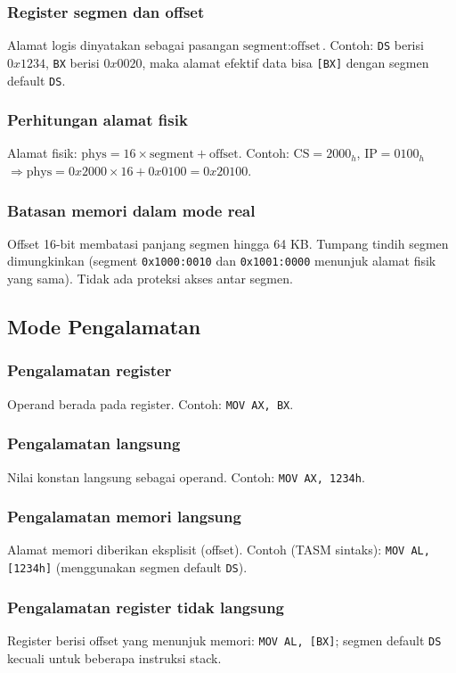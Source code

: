 \subsubsection{Register segmen dan offset}
Alamat logis dinyatakan sebagai pasangan \(\text{segment}:\text{offset}\). Contoh: \texttt{DS} berisi \(0x1234\), \texttt{BX} berisi \(0x0020\), maka alamat efektif data bisa \texttt{[BX]} dengan segmen default \texttt{DS}.

\subsubsection{Perhitungan alamat fisik}
Alamat fisik: \(\text{phys} = 16 \times \text{segment} + \text{offset}\). Contoh: \(\text{CS} = 2000_h\), \(\text{IP} = 0100_h\) \(\Rightarrow \text{phys} = 0x2000\times 16 + 0x0100 = 0x20100\).

\subsubsection{Batasan memori dalam mode real}
Offset 16-bit membatasi panjang segmen hingga 64 KB. Tumpang tindih segmen dimungkinkan (segment \texttt{0x1000:0010} dan \texttt{0x1001:0000} menunjuk alamat fisik yang sama). Tidak ada proteksi akses antar segmen.

\subsection{Mode Pengalamatan}
\subsubsection{Pengalamatan register}
Operand berada pada register. Contoh: \texttt{MOV AX, BX}.

\subsubsection{Pengalamatan langsung}
Nilai konstan langsung sebagai operand. Contoh: \texttt{MOV AX, 1234h}.

\subsubsection{Pengalamatan memori langsung}
Alamat memori diberikan eksplisit (offset). Contoh (TASM sintaks): \texttt{MOV AL, [1234h]} (menggunakan segmen default \texttt{DS}).

\subsubsection{Pengalamatan register tidak langsung}
Register berisi offset yang menunjuk memori: \texttt{MOV AL, [BX]}; segmen default \texttt{DS} kecuali untuk beberapa instruksi stack.

